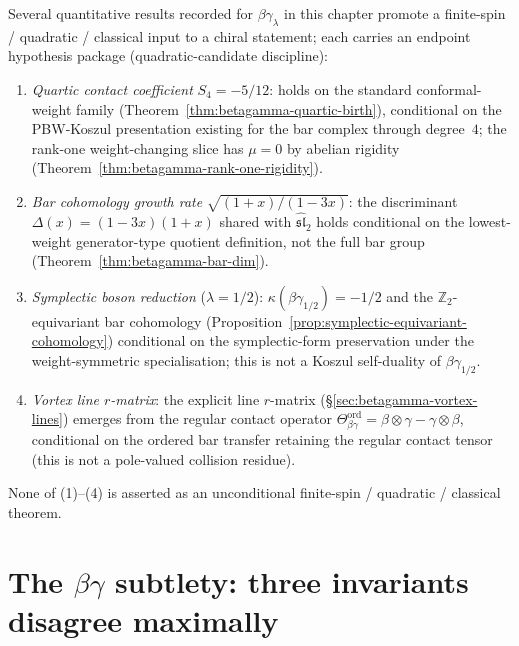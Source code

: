 \begin{remark}
\label{rem:betagamma-endpoint-hypotheses}
Several quantitative results recorded for $\beta\gamma_\lambda$
in this chapter promote a finite-spin / quadratic / classical input
to a chiral statement; each carries an endpoint hypothesis package
(quadratic-candidate discipline):
\begin{enumerate}[label=\textup{(\arabic*)}]
\item \emph{Quartic contact coefficient} $S_4=-5/12$:
holds on the standard conformal-weight family
(Theorem~\ref{thm:betagamma-quartic-birth}), conditional on the
PBW-Koszul presentation existing for the bar complex through
degree~$4$; the rank-one weight-changing slice has $\mu=0$
by abelian rigidity (Theorem~\ref{thm:betagamma-rank-one-rigidity}).
\item \emph{Bar cohomology growth rate} $\sqrt{(1+x)/(1-3x)}$:
the discriminant $\Delta(x)=(1-3x)(1+x)$ shared with
$\widehat{\mathfrak{sl}}_2$ holds conditional on the lowest-weight
generator-type quotient definition, not the full bar group
(Theorem~\ref{thm:betagamma-bar-dim}).
\item \emph{Symplectic boson reduction} ($\lambda=1/2$):
$\kappa(\beta\gamma_{1/2})=-1/2$ and the $\mathbb{Z}_2$-equivariant
bar cohomology
(Proposition~\ref{prop:symplectic-equivariant-cohomology})
conditional on the symplectic-form preservation under the
weight-symmetric specialisation; this is not a Koszul self-duality
of $\beta\gamma_{1/2}$.
\item \emph{Vortex line $r$-matrix}: the explicit line $r$-matrix
(\S\ref{sec:betagamma-vortex-lines}) emerges from the regular contact
operator $\Theta^{\mathrm{ord}}_{\beta\gamma}=
\beta\otimes\gamma-\gamma\otimes\beta$, conditional on the
ordered bar transfer retaining the regular contact tensor
(this is not a pole-valued collision residue).
\end{enumerate}
None of (1)--(4) is asserted as an unconditional finite-spin /
quadratic / classical theorem.
\end{remark}

\section{The
\texorpdfstring{$\beta\gamma$}{beta-gamma} subtlety: three
invariants disagree maximally}
\label{sec:beta-gamma-subtlety}


